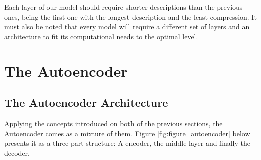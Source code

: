Each layer of our model should require shorter descriptions than the previous ones, being the first one with the longest description and the least compression. It must also be noted that every model will require a different set of layers and an architecture to fit its computational needs to the optimal level. \par

\section{The Autoencoder}

\subsection{The Autoencoder Architecture}

Applying the concepts introduced on both of the previous sections, the Autoencoder comes as a mixture of them. Figure \ref{fig:figure_autoencoder} below presents it as a three part structure: A encoder, the middle layer and finally the decoder. \par

